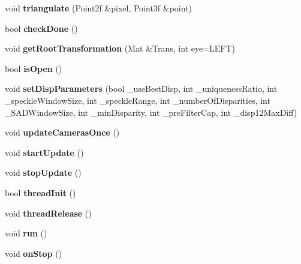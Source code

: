 \begin{DoxyCompactItemize}
\item 
void {\bfseries triangulate} (Point2f \&pixel, Point3f \&point)\label{classDisparityThread_a9f132e68856b56d0dded0f1435d1f34c}

\item 
bool {\bfseries check\+Done} ()\label{classDisparityThread_ac4e45d17e21d68002ed8a3a979e7abab}

\item 
void {\bfseries get\+Root\+Transformation} (Mat \&Trans, int eye=L\+E\+F\+T)\label{classDisparityThread_a9300dc8b230296501c99032633daa0dc}

\item 
bool {\bfseries is\+Open} ()\label{classDisparityThread_af6afa37af0ff8dced127c760c016fe74}

\item 
void {\bfseries set\+Disp\+Parameters} (bool \+\_\+use\+Best\+Disp, int \+\_\+uniqueness\+Ratio, int \+\_\+speckle\+Window\+Size, int \+\_\+speckle\+Range, int \+\_\+number\+Of\+Disparities, int \+\_\+\+S\+A\+D\+Window\+Size, int \+\_\+min\+Disparity, int \+\_\+pre\+Filter\+Cap, int \+\_\+disp12\+Max\+Diff)\label{classDisparityThread_a7c03f103346967e4fe23c315a1ad2f95}

\item 
void {\bfseries update\+Cameras\+Once} ()\label{classDisparityThread_afcfe2413bbbb52bd2e5737197f8c12b1}

\item 
void {\bfseries start\+Update} ()\label{classDisparityThread_a2b80cd97a2bd3f530afdb8615577c2c3}

\item 
void {\bfseries stop\+Update} ()\label{classDisparityThread_a17f750f7e13366abb05f02ca0310ab91}

\item 
bool {\bfseries thread\+Init} ()\label{classDisparityThread_a741ecfd39ec8b949997e38ab31e5908e}

\item 
void {\bfseries thread\+Release} ()\label{classDisparityThread_a29bde42a3bfc24ff666e756febc42334}

\item 
void {\bfseries run} ()\label{classDisparityThread_a88e71e25e8170fe009933cde0c494fca}

\item 
void {\bfseries on\+Stop} ()\label{classDisparityThread_ad354c6f6ee5caba36aea07f66ffbc030}

\end{DoxyCompactItemize}


